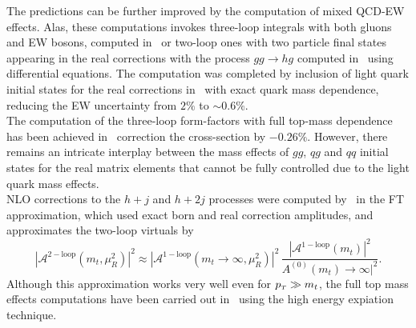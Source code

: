 The predictions can be further improved by the computation of mixed QCD-EW effects. Alas, these computations invokes three-loop integrals with both gluons and EW bosons, computed in~\cite{Bonetti:2017ovy} or two-loop ones with two particle final states appearing in the real corrections with the process $ gg \to hg$ computed in~\cite{Bonetti:2020hqh} using differential equations. The computation was completed by inclusion of light quark initial states for the real corrections in~\cite{Becchetti:2020wof} with exact quark mass dependence, reducing the EW uncertainty from $2\%$ to $ \sim 0.6\%$.  \\ The computation of the three-loop form-factors with full top-mass dependence  has been achieved in~\cite{Czakon:2020vql,Czakon:2021yub} correction the cross-section by $-0.26\%$. However, there remains an intricate interplay between the mass effects of $gg$, $qg$ and $qq$ initial states for the real matrix elements that cannot be fully controlled due to the light quark mass effects. \\ NLO corrections to the $h +j$ and $ h+2j$ processes were computed by~\cite{Maltoni:2014eza} in the FT approximation, which used exact born and real correction amplitudes, and approximates the two-loop virtuals by
\begin{equation}
|	\mathcal A^{\mathrm{2-loop}}(m_t,\mu_R^2) |^2 \approx  |	\mathcal A^{\mathrm{1-loop}}(m_t\to \infty,\mu_R^2) |^2\, \frac{|	\mathcal A^{\mathrm{1-loop}}(m_t) |^2}{A^{\mathrm{(0)}}(m_t)\to \infty |^2}. 
\end{equation}
Although this approximation works very well even for $ p_{\scriptscriptstyle T} \gg m_t$, the full top mass effects computations have been carried out in~\cite{Kudashkin:2017skd,Lindert:2018iug,PhysRevLett.120.162001} using the high energy expiation technique. 
